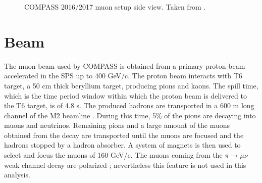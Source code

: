 \begin{figure}[!h]
  \centering
	\caption{COMPASS 2016/2017 muon setup side view. Taken from \cite{NIM}.}
	\label{pic:apparatus}
\end{figure}


\section{Beam}\label{sec:beam}

The muon beam used by COMPASS is obtained from a primary proton beam accelerated in the SPS up to 400 GeV/c. The proton beam interacts with T6 target, a 50 cm thick beryllium target, producing pions and kaons. The spill time, which is the time period window within which the proton beam is delivered to the T6 target, is of 4.8 s. The produced hadrons are transported in a 600 m long channel of the M2 beamline \cite{SPS}. During this time, 5\% of the pions are decaying into muons and neutrinos. Remaining pions and a large amount of the muons obtained from the decay are transported until the muons are focused and the hadrons stopped by a hadron absorber. A system of magnets is then used to select and focus
the muons of 160 GeV/c. The muons coming from the $\pi \rightarrow \mu\nu$ weak channel decay are polarized ; nevertheless this feature is not used in this analysis.

